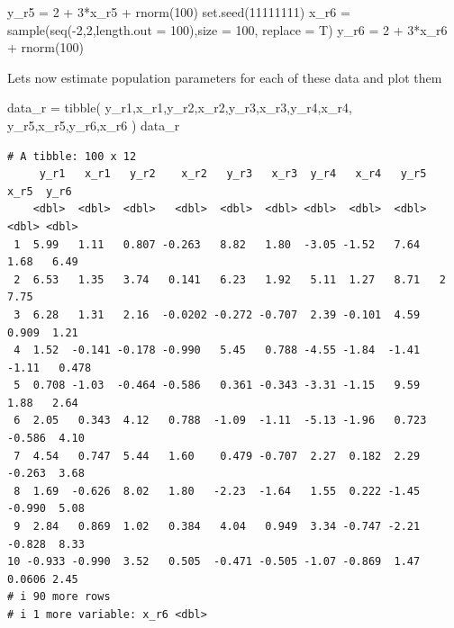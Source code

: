 \documentclass[
  letterpaper,
  DIV=11,
  numbers=noendperiod]{scrreprt}
\newenvironment{Shaded}{\begin{snugshade}}{\end{snugshade}}
\newcommand{\AttributeTok}[1]{\textcolor[rgb]{0.65,0.35,0.00}{#1}}
\newcommand{\DecValTok}[1]{\textcolor[rgb]{0.47,0.16,0.63}{#1}}
\newcommand{\FunctionTok}[1]{\textcolor[rgb]{0.02,0.16,0.49}{#1}}
\newcommand{\NormalTok}[1]{\textcolor[rgb]{0.33,0.33,0.33}{#1}}
\newcommand{\OtherTok}[1]{\textcolor[rgb]{0.85,0.12,0.09}{#1}}
\newcommand{\SpecialCharTok}[1]{\textcolor[rgb]{0.00,0.46,0.62}{#1}}
\begin{document}
\begin{Shaded}
\begin{Highlighting}[]
\NormalTok{y\_r5 }\OtherTok{=} \DecValTok{2} \SpecialCharTok{+} \DecValTok{3}\SpecialCharTok{*}\NormalTok{x\_r5 }\SpecialCharTok{+} \FunctionTok{rnorm}\NormalTok{(}\DecValTok{100}\NormalTok{)}
\FunctionTok{set.seed}\NormalTok{(}\DecValTok{11111111}\NormalTok{)}
\NormalTok{x\_r6 }\OtherTok{=} \FunctionTok{sample}\NormalTok{(}\FunctionTok{seq}\NormalTok{(}\SpecialCharTok{{-}}\DecValTok{2}\NormalTok{,}\DecValTok{2}\NormalTok{,}\AttributeTok{length.out =} \DecValTok{100}\NormalTok{),}\AttributeTok{size =} \DecValTok{100}\NormalTok{, }\AttributeTok{replace =}\NormalTok{ T)}
\NormalTok{y\_r6 }\OtherTok{=} \DecValTok{2} \SpecialCharTok{+} \DecValTok{3}\SpecialCharTok{*}\NormalTok{x\_r6 }\SpecialCharTok{+} \FunctionTok{rnorm}\NormalTok{(}\DecValTok{100}\NormalTok{)}
\end{Highlighting}
\end{Shaded}

Lets now estimate population parameters for each of these data and plot
them

\begin{Shaded}
\begin{Highlighting}[]
\NormalTok{data\_r }\OtherTok{=} \FunctionTok{tibble}\NormalTok{(}
\NormalTok{  y\_r1,x\_r1,y\_r2,x\_r2,y\_r3,x\_r3,y\_r4,x\_r4, y\_r5,x\_r5,y\_r6,x\_r6}
\NormalTok{)}
\NormalTok{data\_r}
\end{Highlighting}
\end{Shaded}

\begin{verbatim}
# A tibble: 100 x 12
     y_r1   x_r1   y_r2    x_r2   y_r3   x_r3  y_r4   x_r4   y_r5    x_r5  y_r6
    <dbl>  <dbl>  <dbl>   <dbl>  <dbl>  <dbl> <dbl>  <dbl>  <dbl>   <dbl> <dbl>
 1  5.99   1.11   0.807 -0.263   8.82   1.80  -3.05 -1.52   7.64   1.68   6.49 
 2  6.53   1.35   3.74   0.141   6.23   1.92   5.11  1.27   8.71   2      7.75 
 3  6.28   1.31   2.16  -0.0202 -0.272 -0.707  2.39 -0.101  4.59   0.909  1.21 
 4  1.52  -0.141 -0.178 -0.990   5.45   0.788 -4.55 -1.84  -1.41  -1.11   0.478
 5  0.708 -1.03  -0.464 -0.586   0.361 -0.343 -3.31 -1.15   9.59   1.88   2.64 
 6  2.05   0.343  4.12   0.788  -1.09  -1.11  -5.13 -1.96   0.723 -0.586  4.10 
 7  4.54   0.747  5.44   1.60    0.479 -0.707  2.27  0.182  2.29  -0.263  3.68 
 8  1.69  -0.626  8.02   1.80   -2.23  -1.64   1.55  0.222 -1.45  -0.990  5.08 
 9  2.84   0.869  1.02   0.384   4.04   0.949  3.34 -0.747 -2.21  -0.828  8.33 
10 -0.933 -0.990  3.52   0.505  -0.471 -0.505 -1.07 -0.869  1.47   0.0606 2.45 
# i 90 more rows
# i 1 more variable: x_r6 <dbl>
\end{verbatim}
\end{document}
